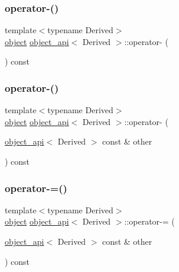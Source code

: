 \subsubsection{\texorpdfstring{operator-\/()}{operator-()}\hspace{0.1cm}{\footnotesize\ttfamily [1/2]}}
{\footnotesize\ttfamily template$<$typename Derived$>$ \\
\mbox{\hyperlink{classobject}{object}} \mbox{\hyperlink{classobject__api}{object\+\_\+api}}$<$ Derived $>$\+::operator-\/ (\begin{DoxyParamCaption}{ }\end{DoxyParamCaption}) const}

\mbox{\label{classobject__api_af0b869fef44a2e9fa441cf401cb5924e}} 
\subsubsection{\texorpdfstring{operator-\/()}{operator-()}\hspace{0.1cm}{\footnotesize\ttfamily [2/2]}}
{\footnotesize\ttfamily template$<$typename Derived$>$ \\
\mbox{\hyperlink{classobject}{object}} \mbox{\hyperlink{classobject__api}{object\+\_\+api}}$<$ Derived $>$\+::operator-\/ (\begin{DoxyParamCaption}\item[{\mbox{\hyperlink{classobject__api}{object\+\_\+api}}$<$ Derived $>$ const \&}]{other }\end{DoxyParamCaption}) const}

\mbox{\label{classobject__api_adb8d619cd0c82fdba2abf02874b36a9b}} 
\subsubsection{\texorpdfstring{operator-\/=()}{operator-=()}}
{\footnotesize\ttfamily template$<$typename Derived$>$ \\
\mbox{\hyperlink{classobject}{object}} \mbox{\hyperlink{classobject__api}{object\+\_\+api}}$<$ Derived $>$\+::operator-\/= (\begin{DoxyParamCaption}\item[{\mbox{\hyperlink{classobject__api}{object\+\_\+api}}$<$ Derived $>$ const \&}]{other }\end{DoxyParamCaption}) const}

